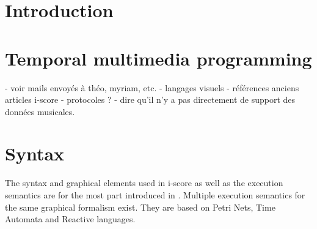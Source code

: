 \documentclass{article}
\title{\papertitle}
\begin{document}
%
\capstartfalse
\maketitle
\capstarttrue
%
\begin{abstract}
     The development and authoring of interactive music or applications, such as user interfaces for arts \& exhibitions
     has traditionally been done with tools that pertain to two broad metaphors. 
     Cue-based environments work by making groups of parameters and sending them to remote devices, 
     while more interactive applications are generally written in generic art-oriented 
     programming environments, such as Max/MSP, Processing or OpenFrameworks.
     In this paper, we argue about the specific issues that arise in such environments, and we present 
     the current version of the i-score sequencer. It is an extensive software suite that bridges
     the gap between time-based, logic-based and flow-based interactive application authoring tools. 
     This is done in a single cohesive graphical user interface, built upon a few simple and novel primitives that give to the composer the expressive power of structured programming, in a time line adapted to the notation of parameter-oriented interactive music.    
\end{abstract}
%

\section{Introduction}\label{sec:introduction}

\section{Temporal multimedia programming}\label{sec:page_size}
\cite{ackermann1994direct}\cite{song1999interactive}
- voir mails envoyés à théo, myriam, etc.
- langages visuels
- références anciens articles i-score 
- protocoles ?
- dire qu'il n'y a pas directement de support des données musicales.

\section{Syntax}
The syntax and graphical elements used in i-score as well as the 
execution semantics are for the most part introduced in \cite{celerier2015ossia, baltazar2014score}.
Multiple execution semantics for the same graphical formalism exist. 
They are based on Petri Nets, Time Automata and Reactive languages.
\end{document}
